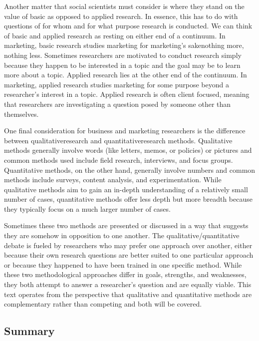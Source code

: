 Another matter that social scientists must consider is where they stand on the value of basic as opposed to applied research. In essence, this has to do with questions of for whom and for what purpose research is conducted. We can think of basic and applied research as resting on either end of a continuum. In marketing, basic research studies marketing for marketing's sake\textemdash nothing more, nothing less. Sometimes researchers are motivated to conduct research simply because they happen to be interested in a topic and the goal may be to learn more about a topic. Applied research lies at the other end of the continuum. In marketing, applied research studies marketing for some purpose beyond a researcher's interest in a topic. Applied research is often client focused, meaning that researchers are investigating a question posed by someone other than themselves.

One final consideration for business and marketing researchers is the difference between \gls{qualitativeresearch} and \gls{quantitativeresearch} methods. Qualitative methods generally involve words (like letters, memos, or policies) or pictures and common methods used include field research, interviews, and focus groups. Quantitative methods, on the other hand, generally involve numbers and common methods include surveys, content analysis, and experimentation. While qualitative methods aim to gain an in-depth understanding of a relatively small number of cases, quantitative methods offer less depth but more breadth because they typically focus on a much larger number of cases.

Sometimes these two methods are presented or discussed in a way that suggests they are somehow in opposition to one another. The qualitative/quantitative debate is fueled by researchers who may prefer one approach over another, either because their own research questions are better suited to one particular approach or because they happened to have been trained in one specific method. While these two methodological approaches differ in goals, strengths, and weaknesses, they both attempt to answer a researcher's question and are equally viable. This text operates from the perspective that qualitative and quantitative methods are complementary rather than competing and both will be covered. 

\subsection{Summary}

